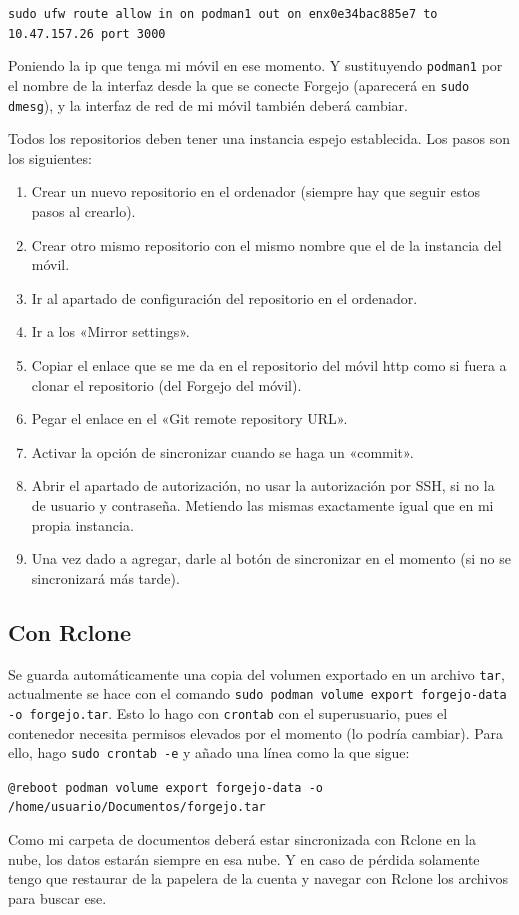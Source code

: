 \documentclass{article}
\begin{document}
    \texttt{sudo ufw route allow in on podman1 out on enx0e34bac885e7 to 10.47.157.26 port 3000}

    Poniendo la ip que tenga mi móvil en ese momento. Y sustituyendo
    \texttt{podman1} por el nombre de la interfaz desde la que se conecte
    Forgejo (aparecerá en \texttt{sudo dmesg}), y la interfaz de red de mi móvil
    también deberá cambiar.

    Todos los repositorios deben tener una instancia espejo establecida. Los pasos
    son los siguientes:

    \begin{enumerate}
        \item Crear un nuevo repositorio en el ordenador (siempre hay que seguir estos
        pasos al crearlo).
        \item Crear otro mismo repositorio con el mismo nombre que el de la instancia del móvil.
        \item Ir al apartado de configuración del repositorio en el ordenador.
        \item Ir a los «Mirror settings».
        \item Copiar el enlace que se me da en el repositorio del móvil http como si
        fuera a clonar el repositorio (del Forgejo del móvil).
        \item Pegar el enlace en el «Git remote repository URL».
        \item Activar la opción de sincronizar cuando se haga un «commit».
        \item Abrir el apartado de autorización, no usar la autorización por SSH, si no
        la de usuario y contraseña. Metiendo las mismas exactamente igual que en mi propia
        instancia.
        \item Una vez dado a agregar, darle al botón de sincronizar en el momento (si no
        se sincronizará más tarde).
    \end{enumerate}

    \subsection{Con Rclone}
    Se guarda automáticamente una copia del volumen exportado en un archivo \texttt{tar},
    actualmente se hace con el comando \texttt{sudo podman volume export forgejo-data -o forgejo.tar}.
    Esto lo hago con \texttt{crontab} con el superusuario, pues el contenedor necesita
    permisos elevados por el momento (lo podría cambiar). Para ello, hago \texttt{sudo crontab -e}
    y añado una línea como la que sigue:

    \texttt{@reboot podman volume export forgejo-data -o /home/usuario/Documentos/forgejo.tar}

    Como mi carpeta de documentos deberá estar sincronizada con Rclone en la nube, los
    datos estarán siempre en esa nube. Y en caso de pérdida solamente tengo que restaurar
    de la papelera de la cuenta y navegar con Rclone los archivos para buscar ese.
\end{document}

